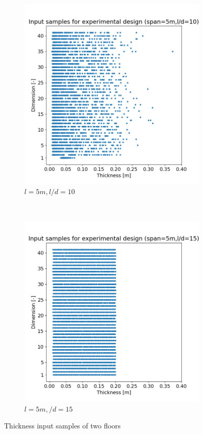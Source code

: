 \begin{figure}[H]
\begin{subfigure}[b]{.49\textwidth}
  \centering
  \includegraphics[width=.99\linewidth]{images/sample_10.png}
  \caption{$l=5m,l/d=10$}
\end{subfigure}
~
\begin{subfigure}[b]{.49\textwidth}
  \centering
  \includegraphics[width=.99\linewidth]{images/sample_15.png}
  \caption{$l=5m,/d=15$}
\end{subfigure}

\caption{Thickness input samples of two floors}
\label{fig:sample}
\end{figure}

